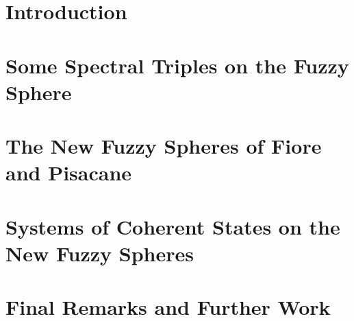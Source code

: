 \documentclass[12pt]{report}
\theoremstyle{definition}
\begin{document}
\chapter{Introduction}\label{chp:intro}


\chapter{Some Spectral Triples on the Fuzzy Sphere}\label{chp:fuzzysphere}


\chapter{The New Fuzzy Spheres of Fiore and Pisacane}\label{chp:NewFuzzy}


\chapter{Systems of Coherent States on the New Fuzzy Spheres}\label{chp:CHNew}


% 

\chapter{Final Remarks and Further Work}
 \label{chp:remarks}

\printbibliography
\end{document}
